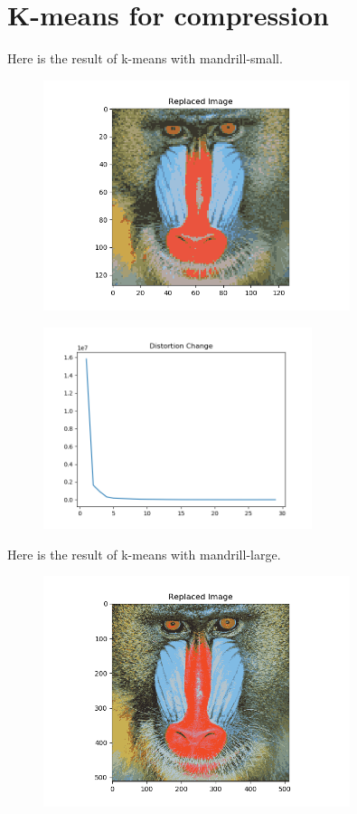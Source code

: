 \documentclass[12pt]{article}
\begin{document}
    \section*{K-means for compression}
    Here is the result of k-means with mandrill-small.
    \begin{figure}[H]
        \centering
        \includegraphics[width=0.80\textwidth]{Q5/replaced_small.png}
    \end{figure}
    \begin{figure}[H]
        \centering
        \includegraphics[width=0.70\textwidth]{Q5/distortion_small.png}
    \end{figure}
    Here is the result of k-means with mandrill-large.
    \begin{figure}[H]
        \centering
        \includegraphics[width=0.80\textwidth]{Q5/replaced_large.png}
    \end{figure}
\end{document}
